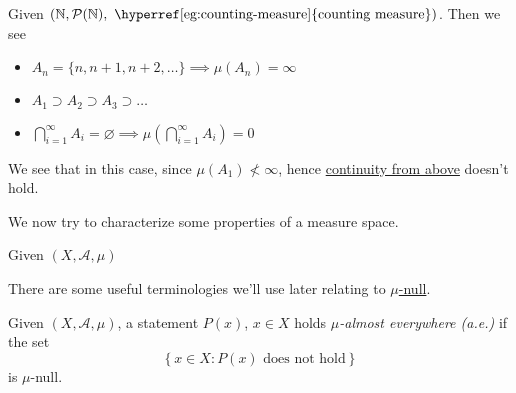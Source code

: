 \begin{eg}
	Given \(\left(\mathbb{\MakeUppercase{N}}, \mathcal{P} (\mathbb{\MakeUppercase{N}}), \text{ \hyperref[eg:counting-measure]{counting measure}}\right)\). Then we see
	\begin{itemize}
		\item \(A_{n} = \{n, n+1, n+2, \ldots  \} \implies \mu(A_{n}) = \infty \)
		\item \(A_1 \supset A_2\supset A_3\supset \ldots  \)
		\item \(\bigcap\limits_{i=1}^{\infty} A_{i} = \varnothing \implies \mu\left(\bigcap\limits_{i=1}^{\infty} A_{i}\right) = 0\)
	\end{itemize}
	\begin{remark}
		We see that in this case, since \(\mu(A_1)\nless \infty \), hence \hyperref[thm:measure-space-continuity-from-above]{continuity from above} doesn't hold.
	\end{remark}
\end{eg}

\hr

We now try to characterize some properties of a measure space.
\begin{definition}
	Given \((X, \mathcal{A} , \mu)\)
\end{definition}

There are some useful terminologies we'll use later relating to \hyperref[def:mu-null-set]{\(\mu\)-null}.
\begin{definition}\label{def:mu-almost-everywhere}
	Given \((X, \mathcal{A} , \mu)\), a statement \(P(x)\), \(x\in X\) holds \emph{\(\mu\)-almost everywhere (a.e.)} if
	the set
	\[
		\left\{x\in X\colon P(x) \text{ does not hold} \right\}
	\]
	is \(\mu\)-null.
\end{definition}

